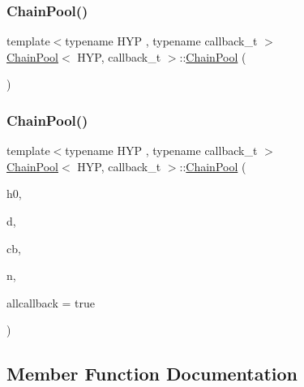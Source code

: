 \subsubsection{\texorpdfstring{Chain\+Pool()}{ChainPool()}\hspace{0.1cm}{\footnotesize\ttfamily [1/2]}}
{\footnotesize\ttfamily template$<$typename H\+YP , typename callback\+\_\+t $>$ \\
\hyperlink{class_chain_pool}{Chain\+Pool}$<$ H\+YP, callback\+\_\+t $>$\+::\hyperlink{class_chain_pool}{Chain\+Pool} (\begin{DoxyParamCaption}{ }\end{DoxyParamCaption})\hspace{0.3cm}{\ttfamily [inline]}}

\mbox{\label{class_chain_pool_a7794efde5588ecbf3603170d6226cd6f}} 
\subsubsection{\texorpdfstring{Chain\+Pool()}{ChainPool()}\hspace{0.1cm}{\footnotesize\ttfamily [2/2]}}
{\footnotesize\ttfamily template$<$typename H\+YP , typename callback\+\_\+t $>$ \\
\hyperlink{class_chain_pool}{Chain\+Pool}$<$ H\+YP, callback\+\_\+t $>$\+::\hyperlink{class_chain_pool}{Chain\+Pool} (\begin{DoxyParamCaption}\item[{H\+YP \&}]{h0,  }\item[{typename H\+Y\+P\+::data\+\_\+t $\ast$}]{d,  }\item[{callback\+\_\+t \&}]{cb,  }\item[{size\+\_\+t}]{n,  }\item[{bool}]{allcallback = {\ttfamily true} }\end{DoxyParamCaption})\hspace{0.3cm}{\ttfamily [inline]}}



\subsection{Member Function Documentation}
\mbox{\label{class_chain_pool_a7df513bcd7b99c2fa99a9cfdd238817b}} 
